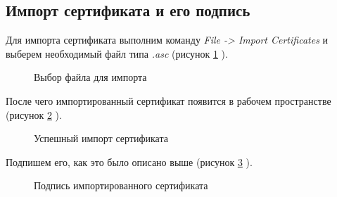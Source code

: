 \documentclass[10pt,a4paper]{report}
\begin{document}
\subsection{Импорт сертификата и его подпись}
Для импорта сертификата выполним команду \textit{File -> Import Certificates} и выберем необходимый файл типа \textit{.asc} (рисунок \ref{ris:image11} ).
\begin{figure}[h]	
\caption{Выбор файла для импорта}
\label{ris:image11}
\end{figure}

После чего импортированный сертификат появится в рабочем пространстве (рисунок \ref{ris:image12} ).
\begin{figure}[h]	
\caption{Успешный импорт сертификата}
\label{ris:image12}
\end{figure}

Подпишем его, как это было описано выше (рисунок \ref{ris:image13} ).
\begin{figure}[h]	
\caption{Подпись импортированного сертификата }
\label{ris:image13}
\end{figure}
\end{document}
